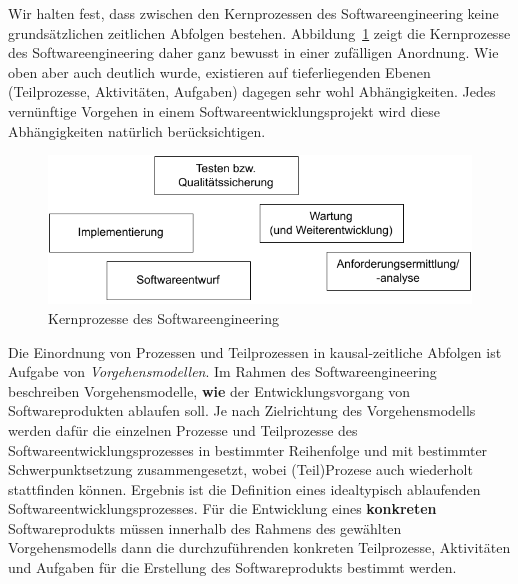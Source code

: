 \clearpage %

Wir halten fest, dass zwischen den Kernprozessen des Softwareengineering keine grundsätzlichen zeitlichen Abfolgen bestehen. Abbildung~\ref{fig:prozesse_softwareengineering} zeigt die Kernprozesse des Softwareengineering daher ganz bewusst in einer zufälligen Anordnung. Wie oben aber auch deutlich wurde, existieren auf tieferliegenden Ebenen (Teilprozesse, Aktivitäten, Aufgaben) dagegen sehr wohl Abhängigkeiten. Jedes vernünftige Vorgehen in einem Softwareentwicklungsprojekt wird diese Abhängigkeiten natürlich berücksichtigen.

\begin{figure}[h!]
    \centering
		\includegraphics[scale=1.0]{Bilder/Kapitel-2/Abb-2-1.pdf}
    \caption{Kernprozesse des Softwareengineering}
    \label{fig:prozesse_softwareengineering}
\end{figure}

Die Einordnung von Prozessen und Teilprozessen in kausal-zeitliche Abfolgen ist Aufgabe von \textit{Vorgehensmodellen}. 
Im Rahmen des Softwareengineering beschreiben Vorgehensmodelle, \textbf{wie} der Entwicklungsvorgang von Softwareprodukten ablaufen soll. Je nach Zielrichtung des Vorgehensmodells werden dafür die einzelnen Prozesse und Teilprozesse des Softwareentwicklungsprozesses in bestimmter Reihenfolge und mit bestimmter Schwerpunktsetzung zusammengesetzt, wobei (Teil)Prozese auch wiederholt stattfinden können. Ergebnis ist die Definition eines idealtypisch ablaufenden Softwareentwicklungsprozesses. Für die Entwicklung eines \textbf{konkreten} Softwareprodukts müssen innerhalb des Rahmens des gewählten Vorgehensmodells dann die durchzuführenden konkreten Teilprozesse, Aktivitäten und Aufgaben für die Erstellung des Softwareprodukts bestimmt werden.

\clearpage


\clearpage









\clearpage


\clearpage
